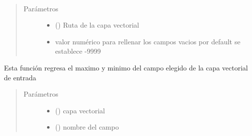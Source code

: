 \documentclass[letterpaper,10pt,spanish]{sphinxmanual}
\begin{document}
\begin{fulllineitems}
\label{\detokenize{apcsig:apcsig.llenar_campos_nulos}}~\begin{quote}\begin{description}
\item[{Parámetros}] \leavevmode\begin{itemize}
\item {} 
 () \textendash{} Ruta de la capa vectorial

\item {} 
 \textendash{} valor numérico para rellenar los campos vacios por default se establece -9999

\end{itemize}

\end{description}\end{quote}

\end{fulllineitems}


\begin{fulllineitems}
\label{\detokenize{apcsig:apcsig.max_min_vector}}
Esta función regresa el maximo y minimo del campo
elegido de la capa vectorial de entrada
\begin{quote}\begin{description}
\item[{Parámetros}] \leavevmode\begin{itemize}
\item {} 
 () \textendash{} capa vectorial

\item {} 
 () \textendash{} nombre del campo

\end{itemize}

\end{description}\end{quote}

\end{fulllineitems}
\end{document}
